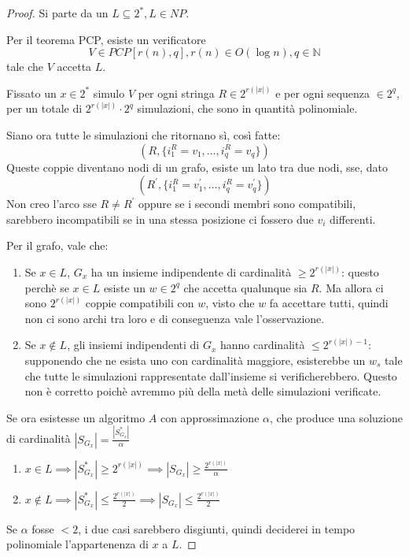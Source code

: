 \begin{proof}
    Si parte da un $L \subseteq 2^*, L \in NP$.

    Per il teorema PCP, esiste un verificatore $$V \in PCP[r(n), q], r(n) \in O(\log n), 
    q \in \mathbb{N}$$
    tale che $V$ accetta $L$.

    Fissato un $x \in 2^*$ simulo $V$ per ogni stringa $R \in 2^{r(|x|)}$ e per 
    ogni sequenza $\in 2^q$, per un totale di $2^{r(|x|)} \cdot 2^q$ simulazioni, 
    che sono in quantità polinomiale.

    Siano ora tutte le simulazioni che ritornano sì, così fatte:
    $$(R, \{i_1^R = v_1, \dots, i_q^R = v_q\})$$
    Queste coppie diventano nodi di un grafo, esiste un lato 
    tra due nodi, sse, dato 
    $$(R^\prime, \{i_1^R = v_1^\prime, \dots, i_q^R = v_q^\prime\})$$
    Non creo l'arco sse $R \neq R^\prime$ oppure se i secondi membri sono compatibili,
    sarebbero incompatibili se in una stessa posizione ci fossero due $v_i$ differenti.
    
    Per il grafo, vale che: 
    \begin{enumerate}
        \item Se $x \in L$, $G_x$ ha un insieme indipendente di cardinalità $\geq 2^{r(|x|)}$:
        questo perchè se $x \in L$ esiste un $w \in 2^q$ che accetta qualunque sia $R$. Ma allora 
        ci sono $2^{r(|x|)}$ coppie compatibili con $w$, visto che $w$ fa accettare tutti, 
        quindi non ci sono archi tra loro e di conseguenza vale l'osservazione.
        \item Se $x \notin L$, gli insiemi indipendenti di $G_x$ hanno cardinalità $\leq 2^{r(|x|) -1}$:
        supponendo che ne esista uno con cardinalità maggiore, esisterebbe un $w_s$ tale che 
        tutte le simulazioni rappresentate dall'insieme si verificherebbero. Questo non è corretto 
        poichè avremmo più della metà delle simulazioni verificate.
    \end{enumerate}

    Se ora esistesse un algoritmo $A$ con approssimazione $\alpha$, che 
    produce una soluzione di cardinalità $|S_{G_x}| = \frac{|S^*_{G_x}|}{\alpha}$
    \begin{enumerate}
        \item $x \in L \implies |S^*_{G_x}| \geq 2^{r(|x|)} \implies |S_{G_x}| \geq \frac{2^{r(|x|)}}{\alpha}$
        \item $x \notin L \implies |S^*_{G_x}| \leq \frac{2^{r(|x|)}}{2} \implies |S_{G_x}| \leq \frac{2^{r(|x|)}}{2}$
    \end{enumerate}
    Se $\alpha$ fosse $< 2$, i due casi sarebbero disgiunti, quindi deciderei in tempo polinomiale
    l'appartenenza di $x$ a $L$.
\end{proof}
